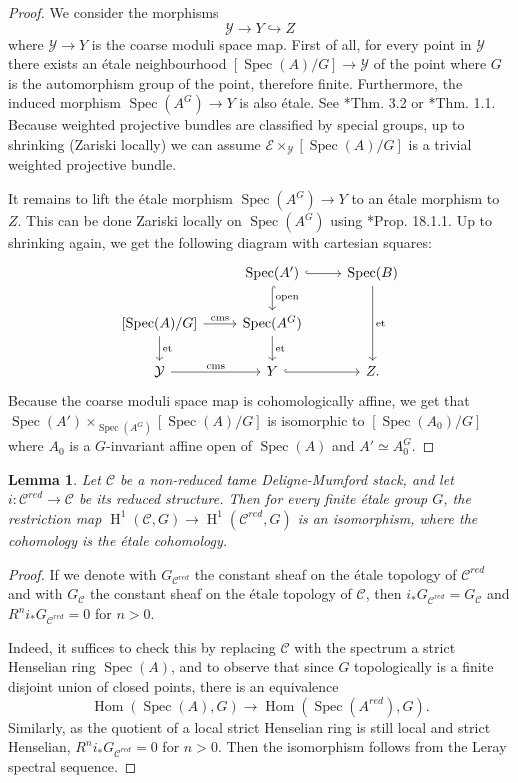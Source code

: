 \documentclass{amsart}
\newcommand{\oH}{\operatorname{H}}
\newcommand{\cC}{\mathcal{C}}
\newcommand{\cE}{\mathcal{E}}
\newcommand{\cY}{\mathcal{Y}}
\newcommand{\spec}{\operatorname{Spec}}
\newtheorem{Lemma}[theorem]{Lemma}
\theoremstyle{definition}
\begin{document}
\begin{proof}
    We consider the morphisms 
    $$ \cY \rightarrow Y \hookrightarrow Z$$
    where $\cY \rightarrow Y$ is the coarse moduli space map. First of all, for every point in $\cY$ there exists an \'etale neighbourhood $[\spec (A)/G]\rightarrow \cY$ of the point where $G$ is the automorphism group of the point, therefore finite. Furthermore, the induced morphism $\spec (A^G) \rightarrow Y$ is also \'etale. See \cite{AOV_tame}*{Thm. 3.2} or \cite{AlperHallRydh}*{Thm. 1.1}. Because weighted projective bundles are classified by special groups, up to shrinking (Zariski locally) we can assume $\cE \times_{\cY} [\spec (A) /G]$ is a trivial weighted projective bundle. 

    It remains to lift the \'etale morphism $\spec(A^G)\to Y$ to an \'etale morphism to $Z$. This can be done Zariski locally on $\spec(A^G)$ using \cite{EGAIV}*{Prop. 18.1.1}. Up to shrinking again, we get the following diagram with cartesian squares:
    $$
   \begin{tikzcd}
& \spec (A') \arrow[d, "{\rm open}", hook] \arrow[r, hook] & \spec (B) \arrow[dd, "{\rm et}"] \\
{[\spec (A)/G]} \arrow[d, "{\rm et}"] \arrow[r, "{\rm cms}"] & \spec(A^G) \arrow[d, "{\rm et}"]                       &                                \\
\cY  \arrow[r, "{\rm cms}"]                                & Y \arrow[r, hook]                                      & Z.                             
\end{tikzcd}
$$
   Because the coarse moduli space map is cohomologically affine, we get that $\spec (A') \times_{\spec(A^G)} [\spec (A)/G]$ is isomorphic to $[\spec(A_0)/G]$ where $A_0$ is a  $G$-invariant affine open of $\spec (A)$ and $A'\simeq A_0^G$.
\end{proof}


\begin{Lemma}\label{lemma_extending_torsor_nonred_structure}
    Let $\cC$ be a non-reduced \textcolor{black}{tame} Deligne-Mumford stack, and let $i:\cC^{red}\to \cC$ be its reduced structure. Then for every finite \'etale group $G$, the restriction map $\oH^1(\cC,G)\to \oH^1(\cC^{red},G)$ is an isomorphism, where the cohomology is the \'etale cohomology.
\end{Lemma}
\begin{proof}

If we denote with $G_{\cC^{red}}$ the constant sheaf on the \'etale topology of $\cC^{red}$ and with $G_{\cC}$ the constant sheaf on the \'etale topology of $\cC$, then $i_*G_{\cC^{red}}=G_{\cC}$ and $R^ni_*G_{\cC^{red}}=0$ for $n>0$.

Indeed, it suffices to check this by replacing $\cC$ with the spectrum a strict Henselian ring $\spec(A)$, and to observe that since $G$ topologically is a finite disjoint union of closed points, there is an equivalence
    $$\operatorname{Hom}(\spec(A),G) \to \operatorname{Hom}(\spec(A^{red}),G).$$
Similarly, as the quotient of a local strict Henselian ring is still local and strict Henselian, $R^ni_*G_{\cC^{red}}=0$ for $n>0$. Then the isomorphism follows from the Leray spectral sequence.
\end{proof}
\end{document}
